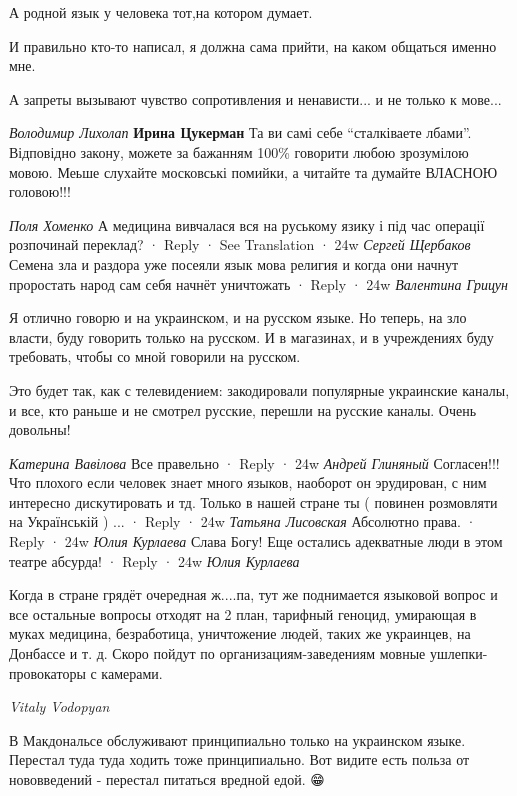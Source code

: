 \begin{itemize}
А родной язык у человека тот,на котором думает.

И правильно кто-то написал, я должна сама прийти, на каком общаться именно мне.

А запреты вызывают чувство сопротивления и ненависти... и не только к мове...

\begin{itemize}
\emph{Володимир Лихолап}
\textbf{Ирина Цукерман} Та ви самі себе \enquote{сталківаете лбами}. Відповідно
закону, можете за бажанням 100\% говорити любою зрозумілою мовою. Меьше
слухайте московські помийки, а читайте та думайте ВЛАСНОЮ головою!!!

\end{itemize}

\emph{Поля Хоменко}
А медицина вивчалася вся на руському язику і під час операції розпочинай переклад?
 · Reply · See Translation · 24w
\emph{Сергей Щербаков}
Семена зла и раздора уже посеяли язык мова религия и когда они начнут проростать народ сам себя начнёт уничтожать
 · Reply · 24w
\emph{Валентина Грицун}

Я отлично говорю и на украинском, и на русском языке. Но теперь, на зло власти,
буду говорить только на русском. И в магазинах, и в учреждениях буду требовать,
чтобы со мной говорили на русском.

Это будет так, как с телевидением: закодировали популярные украинские каналы, и
все, кто раньше и не смотрел русские, перешли на русские каналы. Очень
довольны!

\emph{Катерина Вавілова}
Все правельно
 · Reply · 24w
\emph{Андрей Глиняный}
Согласен!!! Что плохого если человек знает много языков, наоборот он
эрудирован, с ним интересно дискутировать и тд.  Только в нашей стране ты (
повинен розмовляти на Українській ) ...
 · Reply · 24w
\emph{Татьяна Лисовская}
Абсолютно права.
 · Reply · 24w
\emph{Юлия Курлаева}
Слава Богу! Еще остались адекватные люди в этом театре абсурда!
 · Reply · 24w
\emph{Юлия Курлаева}

Когда в стране грядёт очередная ж....па, тут же поднимается языковой вопрос и
все остальные вопросы отходят на 2 план, тарифный геноцид, умирающая в муках
медицина, безработица, уничтожение людей, таких же украинцев, на Донбассе и т.
д. Скоро пойдут по организациям-заведениям мовные ушлепки-провокаторы с
камерами.

\emph{Vitaly Vodopyan}

В Макдональсе обслуживают принципиально только на украинском языке. Перестал
туда туда ходить тоже принципиально.  Вот видите есть польза от нововведений -
перестал питаться вредной едой. 😁


\end{itemize}
